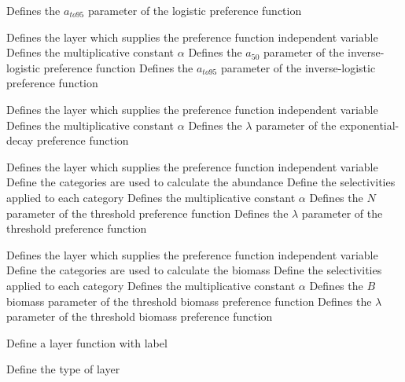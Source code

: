  {Defines the $a_{to95}$ parameter of the logistic preference function}
\par\textbf{}\par
{} {Defines the layer which supplies the preference function independent variable}
 {Defines the multiplicative constant $\alpha$}
 {Defines the $a_{50}$ parameter of the inverse-logistic preference function}
 {Defines the $a_{to95}$ parameter of the inverse-logistic preference function}
\par\textbf{}\par
{} {Defines the layer which supplies the preference function independent variable}
 {Defines the multiplicative constant $\alpha$}
 {Defines the $\lambda$ parameter of the exponential-decay preference function}
\par\textbf{}\par
{} {Defines the layer which supplies the preference function independent variable}
 {Define the categories are used to calculate the abundance}
 {Define the selectivities applied to each category}
 {Defines the multiplicative constant $\alpha$}
 {Defines the $N$ parameter of the threshold preference function}
 {Defines the $\lambda$ parameter of the threshold preference function}
\par\textbf{}\par
{} {Defines the layer which supplies the preference function independent variable}
 {Define the categories are used to calculate the biomass}
 {Define the selectivities applied to each category}
 {Defines the multiplicative constant $\alpha$}
 {Defines the $B$ biomass parameter of the threshold biomass preference function}
 {Defines the $\lambda$ parameter of the threshold biomass preference function}
\par {} {Define a layer function with label}\par
{} {Define the type of layer}
\par\textbf{}\par
